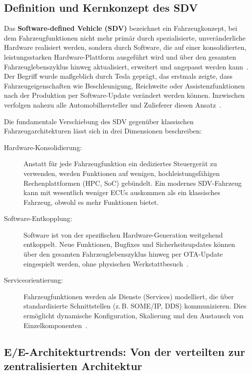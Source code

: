 ﻿\documentclass[12pt,a4paper,twoside]{article}
\begin{document}
\subsection{Definition und Kernkonzept des SDV}
\label{subsec:sdv_definition}

Das \textbf{Software-defined Vehicle (SDV)} bezeichnet ein Fahrzeugkonzept,
bei dem Fahrzeugfunktionen nicht mehr primär durch spezialisierte, unveränderliche
Hardware realisiert werden, sondern durch Software, die auf einer konsolidierten,
leistungsstarken Hardware-Plattform ausgeführt wird und über den gesamten
Fahrzeuglebenszyklus hinweg aktualisiert, erweitert und angepasst werden
kann~\cite{kugele2018sdv}. Der Begriff wurde maßgeblich durch Tesla geprägt,
das erstmals zeigte, dass Fahrzeugeigenschaften wie Beschleunigung, Reichweite
oder Assistenzfunktionen nach der Produktion per Software-Update verändert werden
können. Inzwischen verfolgen nahezu alle Automobilhersteller und Zulieferer
diesen Ansatz~\cite{halder2020secure}.

Die fundamentale Verschiebung des SDV gegenüber klassischen Fahrzeugarchitekturen
lässt sich in drei Dimensionen beschreiben:

\begin{description}
  \item[Hardware-Konsolidierung:] Anstatt für jede Fahrzeugfunktion ein dediziertes
    Steuergerät zu verwenden, werden Funktionen auf wenigen, hochleistungsfähigen
    Rechenplattformen (HPC, SoC) gebündelt. Ein modernes SDV-Fahrzeug kann mit
    wesentlich weniger ECUs auskommen als ein klassisches Fahrzeug, obwohl es mehr
    Funktionen bietet.
  \item[Software-Entkopplung:] Software ist von der spezifischen Hardware-Generation
    weitgehend entkoppelt. Neue Funktionen, Bugfixes und Sicherheitsupdates können
    über den gesamten Fahrzeuglebenszyklus hinweg per OTA-Update eingespielt werden,
    ohne physischen Werkstattbesuch~\cite{nilsson2008key}.
  \item[Serviceorientierung:] Fahrzeugfunktionen werden als Dienste (Services)
    modelliert, die über standardisierte Schnittstellen (z.\,B. SOME/IP, DDS)
    kommunizieren. Dies ermöglicht dynamische Konfiguration, Skalierung und
    den Austausch von Einzelkomponenten~\cite{zelle2020security}.
\end{description}

\subsection{E/E-Architekturtrends: Von der verteilten zur zentralisierten Architektur}
\label{subsec:ee_architektur}
\end{document}
